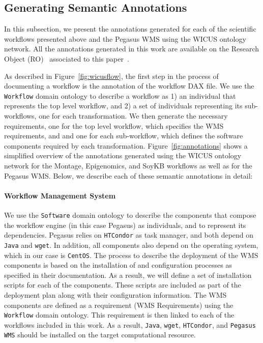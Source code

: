 \subsection{Generating Semantic Annotations}

In this subsection, we present the annotations generated for each of the scientific 
workflows presented above and the Pegasus WMS using the WICUS ontology
network. All the annotations generated in this work are available on the 
Research Object (RO)~\cite{researchObjects} associated to this paper~\cite{fgcs-2015-object}.

 As described in Figure~\ref{fig:wicusflow}, the first step in the process of 
documenting a workflow is the annotation of the workflow DAX file. We use the 
\texttt{Workflow} domain ontology to describe a workflow as 1) an individual that 
represents the top level workflow, and 2) a set of individuals representing its 
sub-workflows, one for each transformation. We then generate the necessary 
requirements, one for the top level workflow, which specifies the WMS requirements, and
and one for each sub-workflow, which defines the software components required 
by each transformation. 
Figure~\ref{fig:annotations} shows a simplified overview of the annotations generated 
using the WICUS ontology network for the Montage, Epigenomics, and SoyKB 
workflows as well as for the Pegasus WMS. Below, we describe each of these
semantic annotations in detail:


\paragraph{\textbf{Workflow Management System}}
We use the \texttt{Software} domain ontology to describe the components that
compose the workflow engine (in this case Pegasus) as individuals, and to 
represent its dependencies. Pegasus relies on \texttt{HTCondor} as task manager, and 
both depend on \texttt{Java} and \texttt{wget}. In addition, all components also
depend on the operating system, which in our case is \texttt{CentOS}. The process
to describe the deployment of the WMS components is based on the installation of
and configuration processes as specified in their documentation. As a result, we will
define a set of installation scripts for each of the components. These scripts are 
included as part of the deployment plan along with their configuration information.
The WMS components are defined as a requirement (WMS Requirements) using
the \texttt{Workflow} domain ontology. This requirement is then linked to each
of the workflows included in this work. As a result, \texttt{Java}, \texttt{wget}, 
\texttt{HTCondor}, and \texttt{Pegasus WMS} should be installed on the target
computational resource.


